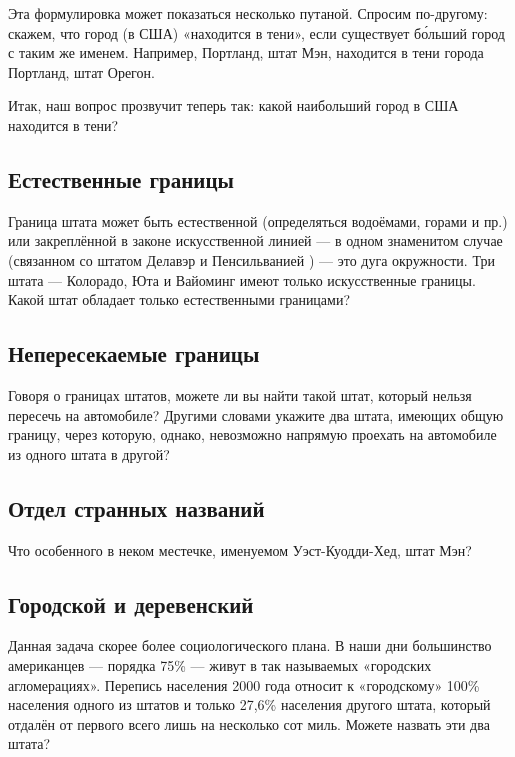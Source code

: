 \medskip

Эта формулировка может показаться несколько путаной.
Спросим по-другому: скажем, что город (в США) «находится в тени», если существует б\'{о}льший город с таким же именем.
Например, Портланд, штат Мэн, находится в тени города Портланд, штат Орегон.

Итак, наш вопрос прозвучит теперь так: какой наибольший город в США находится в тени?   

\subsection*{Естественные границы}%

Граница штата может быть естественной (определяться водоёмами, горами и пр.) или 
закреплённой в законе искусственной линией --- в одном знаменитом случае (связанном со штатом Делавэр и Пенсильванией ) --- это дуга окружности.
Три штата --- Колорадо, Юта и Вайоминг имеют только искусственные границы.
Какой штат обладает только естественными границами?   

\subsection*{Непересекаемые границы}%

Говоря о границах штатов, можете ли вы найти такой штат, который нельзя пересечь на автомобиле? Другими словами укажите два штата, имеющих общую границу, через которую, однако, невозможно напрямую проехать на автомобиле из одного штата в другой?   

\subsection*{Отдел странных названий}%

Что особенного в неком местечке, именуемом Уэст-Куодди-Хед, %
штат Мэн?   

\subsection*{Городской и деревенский}%

Данная задача скорее более социологического плана.
В наши дни большинство американцев --- порядка 75\% --- живут в так называемых «городских агломерациях».
Перепись населения 2000 года относит к «городскому» 100\% населения одного из штатов и только 27,6\% населения другого штата, который отдалён от первого всего лишь на несколько сот миль.
Можете назвать эти два штата?   

